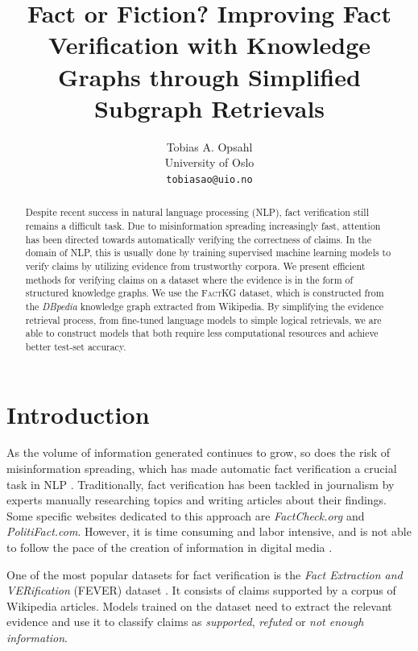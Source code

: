 \documentclass[11pt]{article}
\title{Fact or Fiction? Improving Fact Verification with Knowledge Graphs through Simplified Subgraph Retrievals}
\author{Tobias A. Opsahl \\
  University of Oslo  \\
  \texttt{tobiasao@uio.no}
  }
\begin{document}
\maketitle
\begin{abstract}

Despite recent success in natural language processing (NLP), fact verification still remains a difficult task. Due to misinformation spreading increasingly fast, attention has been directed towards automatically verifying the correctness of claims. In the domain of NLP, this is usually done by training supervised machine learning models to verify claims by utilizing evidence from trustworthy corpora. We present efficient methods for verifying claims on a dataset where the evidence is in the form of structured knowledge graphs. We use the \textsc{FactKG} dataset, which is constructed from the \emph{DBpedia} knowledge graph extracted from Wikipedia. By simplifying the evidence retrieval process, from fine-tuned language models to simple logical retrievals, we are able to construct models that both require less computational resources and achieve better test-set accuracy.

\end{abstract}

\section{Introduction}

As the volume of information generated continues to grow, so does the risk of misinformation spreading, which has made automatic fact verification a crucial task in NLP \citep{cohen2011computational_journalism, hassan2015quest_to_automate_fact-checking, thorne2018automated_fact_checking, bekoulis2021review_on_fact_extraction}. Traditionally, fact verification has been tackled in journalism by experts manually researching topics and writing articles about their findings. Some specific websites dedicated to this approach are \emph{FactCheck.org} and \emph{PolitiFact.com}. However, it is time consuming and labor intensive, and is not able to follow the pace of the creation of information in digital media \citep{cohen2011computational_journalism, hassan2015quest_to_automate_fact-checking}.

One of the most popular datasets for fact verification is the \emph{Fact Extraction and VERification} (FEVER) dataset \citep{thorne2018fever}. It consists of claims supported by a corpus of Wikipedia articles. Models trained on the dataset need to extract the relevant evidence and use it to classify claims as \emph{supported}, \emph{refuted} or \emph{not enough information}.
\end{document}
